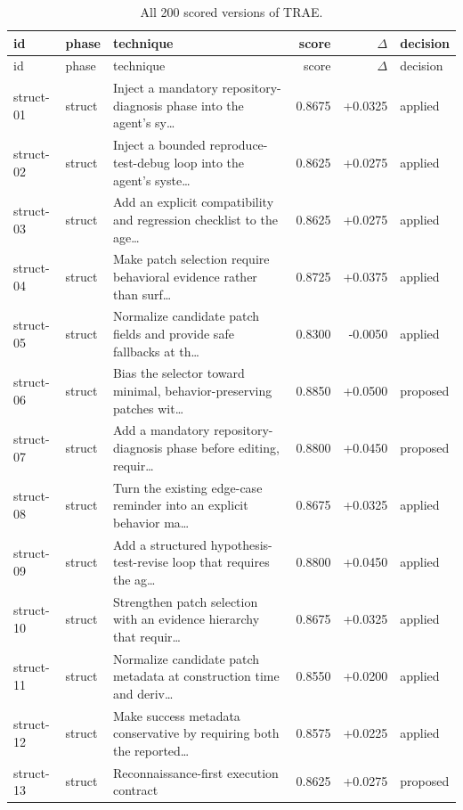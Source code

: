 \begin{center}\scriptsize\begin{longtable}{llp{5.2cm}rrl}
\caption{All 200 scored versions of TRAE.}\\
\toprule id & phase & technique & score & $\Delta$ & decision \\ \midrule \endfirsthead
\toprule id & phase & technique & score & $\Delta$ & decision \\ \midrule \endhead
struct-01 & struct & Inject a mandatory repository-diagnosis phase into the agent's sy\ldots{} & 0.8675 & +0.0325 & applied \\
struct-02 & struct & Inject a bounded reproduce-test-debug loop into the agent's syste\ldots{} & 0.8625 & +0.0275 & applied \\
struct-03 & struct & Add an explicit compatibility and regression checklist to the age\ldots{} & 0.8625 & +0.0275 & applied \\
struct-04 & struct & Make patch selection require behavioral evidence rather than surf\ldots{} & 0.8725 & +0.0375 & applied \\
struct-05 & struct & Normalize candidate patch fields and provide safe fallbacks at th\ldots{} & 0.8300 & -0.0050 & applied \\
struct-06 & struct & Bias the selector toward minimal, behavior-preserving patches wit\ldots{} & 0.8850 & +0.0500 & proposed \\
struct-07 & struct & Add a mandatory repository-diagnosis phase before editing, requir\ldots{} & 0.8800 & +0.0450 & proposed \\
struct-08 & struct & Turn the existing edge-case reminder into an explicit behavior ma\ldots{} & 0.8675 & +0.0325 & applied \\
struct-09 & struct & Add a structured hypothesis-test-revise loop that requires the ag\ldots{} & 0.8800 & +0.0450 & applied \\
struct-10 & struct & Strengthen patch selection with an evidence hierarchy that requir\ldots{} & 0.8675 & +0.0325 & applied \\
struct-11 & struct & Normalize candidate patch metadata at construction time and deriv\ldots{} & 0.8550 & +0.0200 & applied \\
struct-12 & struct & Make success metadata conservative by requiring both the reported\ldots{} & 0.8575 & +0.0225 & applied \\
struct-13 & struct & Reconnaissance-first execution contract & 0.8625 & +0.0275 & proposed \\

\end{longtable}
\end{center}
